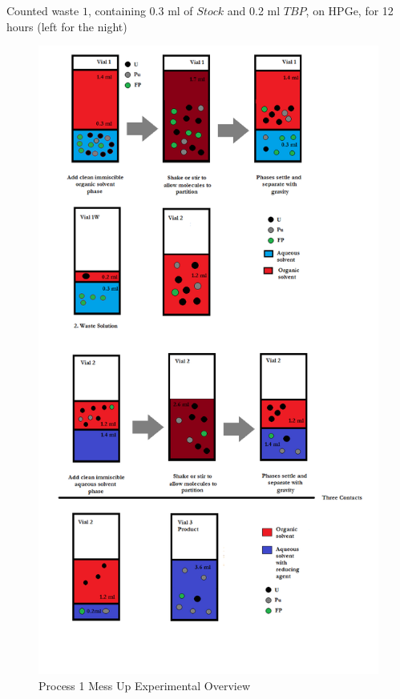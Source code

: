 \documentclass[idxtotoc,hyperref,openany,oneside]{labbook} %
\newcommand{\cmark}{\ding{51}}%
\newcommand{\done}{\rlap{$\square$}{\raisebox{2pt}{\large\hspace{1pt}\cmark}}%
  \hspace{-2.5pt}}
\begin{document}
\begin{todolist}
\item[\done]{Counted waste $\boxed{1}$, containing 0.3
  ml of $\boxed{Stock}$ and 0.2 ml $\boxed{TBP}$, on HPGe,
  for 12 hours (left for the night)}
\end{todolist}

\begin{figure}[H] %
\begin{center}
  \includegraphics[width=0.85\linewidth]
                  {Figures/Process_1_Mess_Up}
\end{center}
\caption{Process 1 Mess Up Experimental Overview}
\label{fig:example2}
\end{figure}
\end{document}
